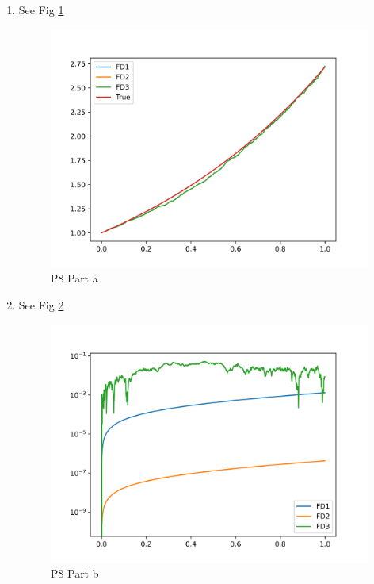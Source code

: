 \documentclass{article}
\begin{document}
    \begin{enumerate}[label=\roman*)]
        \item See Fig \ref{fig:p8pa}
            \begin{figure}[ht]
                \centering
                \includegraphics[width=\textwidth]{prob8_parta.png}
                \caption{P8 Part a}
                \label{fig:p8pa}
            \end{figure}
        \item See Fig \ref{fig:p8pb}
            \begin{figure}[ht]
                \centering
                \includegraphics[width=\textwidth]{prob8_partb.png}
                \caption{P8 Part b}
                \label{fig:p8pb}

\end{figure}
\end{enumerate}
\end{document}
